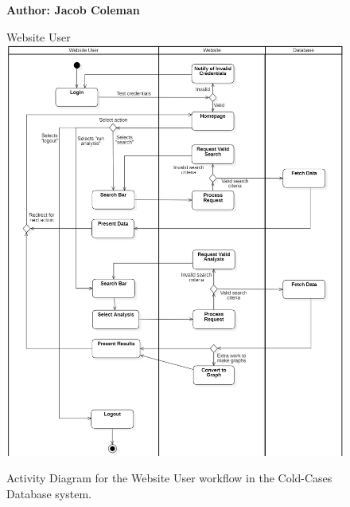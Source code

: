 \documentclass[11pt]{article}
\begin{document}
\begin{figure}[!ht]
\centering
\textbf{Author: Jacob Coleman}
\vspace*{1em}

Website User
	\includegraphics[width=.95\textwidth]{./Activity Diagram/activitydiagram_jardee_2.1}\\
	\caption{Activity Diagram for the Website User workflow in the Cold-Cases Database system.}
	\label{fig:activity_diagram}
\end{figure}
\end{document}
